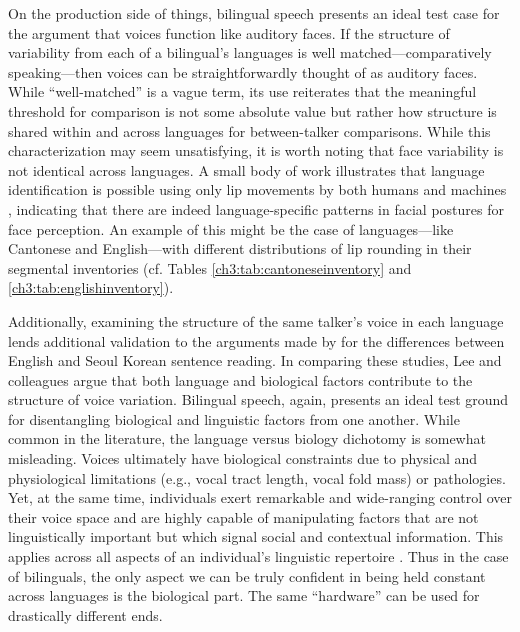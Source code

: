 On the production side of things, bilingual speech presents an ideal test case for the argument that voices function like auditory faces. If the structure of variability from each of a bilingual's languages is well matched---comparatively speaking---then voices can be straightforwardly thought of as auditory faces. While ``well-matched'' is a vague term, its use reiterates that the meaningful threshold for comparison is not some absolute value but rather how structure is shared within and across languages for between-talker comparisons. While this characterization may seem unsatisfying, it is worth noting that face variability is not identical across languages. A small body of work illustrates that language identification is possible using only lip movements by both humans \citep{sotofaraco_2007_discriminating} and machines \citep{afouras_2020_now}, indicating that there are indeed language-specific patterns in facial postures for face perception. An example of this might be the case of languages---like Cantonese and English---with different distributions of lip rounding in their segmental inventories (cf. Tables \ref{ch3:tab:cantoneseinventory} and \ref{ch3:tab:englishinventory}). 

Additionally, examining the structure of the same talker's voice in each language lends additional validation to the arguments made by \citet{lee_2020_language} for the differences between English and Seoul Korean sentence reading. In comparing these studies, Lee and colleagues argue that both language and biological factors contribute to the structure of voice variation. Bilingual speech, again, presents an ideal test ground for disentangling biological and linguistic factors from one another. While common in the literature, the language versus biology dichotomy is somewhat misleading. Voices ultimately have biological constraints due to physical and physiological limitations (e.g., vocal tract length, vocal fold mass) or pathologies. Yet, at the same time, individuals exert remarkable and wide-ranging control over their voice space and are highly capable of manipulating factors that are not linguistically important but which signal social and contextual information. This applies across all aspects of an individual's linguistic repertoire \citep{bullock_2009_sociophonetics,wei_2018_translanguaging}. Thus in the case of bilinguals, the only aspect we can be truly confident in being held constant across languages is the biological part. The same ``hardware'' can be used for drastically different ends. 

